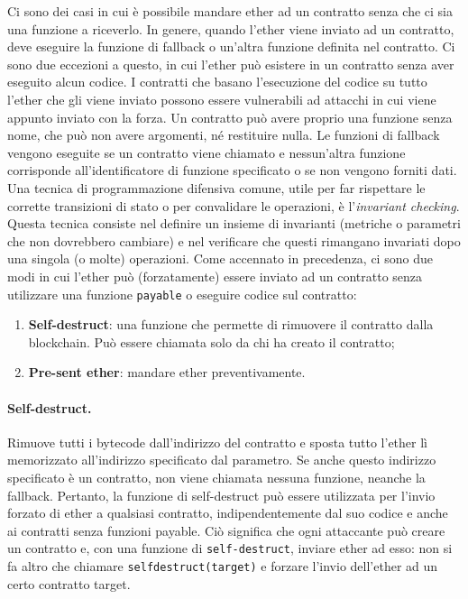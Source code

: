 Ci sono dei casi in cui è possibile mandare ether ad un contratto senza che ci
sia una funzione a riceverlo.
In genere, quando l'ether viene inviato ad un contratto, deve eseguire la
funzione di fallback o un'altra funzione definita nel contratto.
Ci sono due eccezioni a questo, in cui l'ether può
esistere in un contratto senza aver eseguito alcun codice.
I contratti che basano l'esecuzione
del codice su tutto l'ether che gli viene inviato possono essere vulnerabili ad
attacchi in cui
viene appunto inviato con la forza.
Un contratto può avere proprio una funzione senza nome,
che può non avere argomenti, né
restituire nulla. Le funzioni di fallback vengono eseguite se un contratto viene
chiamato e
nessun'altra funzione corrisponde all'identificatore di funzione specificato
o se non vengono forniti dati.
Una tecnica di programmazione difensiva comune, utile per far rispettare le
corrette transizioni di stato o per convalidare le operazioni, è
l'\textit{invariant checking}. Questa tecnica
consiste nel definire un insieme di invarianti
(metriche o parametri che non dovrebbero
cambiare) e nel verificare che questi rimangano invariati dopo una singola (o molte)
operazioni.
Come accennato in precedenza, ci sono due modi in cui l'ether può (forzatamente)
essere
inviato ad un contratto senza utilizzare una funzione \verb|payable| o eseguire
codice sul contratto:

\begin{enumerate}
      \item \textbf{Self-destruct}: una funzione che permette di rimuovere il
            contratto dalla blockchain.
            Può essere chiamata solo da chi ha creato il contratto;
      \item \textbf{Pre-sent ether}: mandare ether preventivamente.
\end{enumerate}

\paragraph{Self-destruct.}

Rimuove tutti i bytecode dall'indirizzo del contratto e sposta tutto l'ether
lì memorizzato all'indirizzo specificato dal parametro. Se anche questo
indirizzo specificato è un contratto,
non viene chiamata nessuna funzione, neanche la fallback. Pertanto, la funzione di
self-destruct può essere utilizzata per l'invio forzato di ether a qualsiasi
contratto,
indipendentemente dal suo codice e anche ai contratti senza funzioni payable.
Ciò significa che ogni attaccante può creare un contratto e, con una funzione di
\verb|self-destruct|,
inviare ether ad esso: non si fa altro che chiamare \verb|selfdestruct(target)|
e forzare
l'invio dell'ether ad un certo contratto target.

